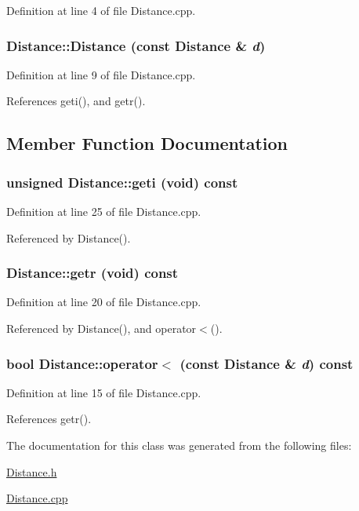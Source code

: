 Definition at line 4 of file Distance.cpp.

\subsubsection[{Distance}]{\setlength{\rightskip}{0pt plus 5cm}Distance::Distance (const {\bf Distance} \& {\em d})}\label{classDistance_ae27d1f8eca9cda4e4435c933e94daa53}


Definition at line 9 of file Distance.cpp.



References geti(), and getr().



\subsection{Member Function Documentation}
\subsubsection[{geti}]{\setlength{\rightskip}{0pt plus 5cm}unsigned Distance::geti (void) const}\label{classDistance_abeeb96ec725b1cb54a3c3e1f26b1f672}


Definition at line 25 of file Distance.cpp.



Referenced by Distance().

\subsubsection[{getr}]{ Distance::getr (void) const}\label{classDistance_ad77d83cf3886ee7a9e72601929f7ef5b}


Definition at line 20 of file Distance.cpp.



Referenced by Distance(), and operator$<$().

\subsubsection[{operator$<$}]{\setlength{\rightskip}{0pt plus 5cm}bool Distance::operator$<$ (const {\bf Distance} \& {\em d}) const}\label{classDistance_adbc75c8ac852f175039550e87d46fb93}


Definition at line 15 of file Distance.cpp.



References getr().



The documentation for this class was generated from the following files:\begin{DoxyCompactItemize}
\item 
\hyperlink{Distance_8h}{Distance.h}\item 
\hyperlink{Distance_8cpp}{Distance.cpp}\end{DoxyCompactItemize}
